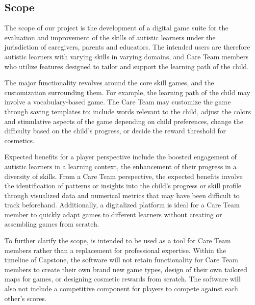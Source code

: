 \documentclass[12pt]{article}
\begin{document}
\subsection{Scope} \label{sec_Scope}

The scope of our project is the development of a digital game suite for the evaluation and improvement of the skills of autistic learners under the jurisdiction of caregivers, parents and educators. The intended users are therefore autistic learners with varying skills in varying domains, and Care Team members who utilize features designed to tailor and support the learning path of the child.

The major functionality revolves around the core skill games, and the customization surrounding them. For example, the learning path of the child may involve a vocabulary-based game. The Care Team may customize the game through saving templates to: include words relevant to the child, adjust the colors and stimulative aspects of the game depending on child preferences, change the difficulty based on the child's progress, or decide the reward threshold for cosmetics. 

Expected benefits for a player perspective include the boosted engagement of autistic learners in a learning context, the enhancement of their progress in a diversity of skills. From a Care Team perspective, the expected benefits involve the identification of patterns or insights into the child's progress or skill profile through visualized data and numerical metrics that may have been difficult to track beforehand. Additionally, a digitalized platform is ideal for a Care Team member to quickly adapt games to different learners without creating or assembling games from scratch.

To further clarify the scope, \progname{} is intended to be used as a tool for Care Team members rather than a replacement for professional expertise. Within the timeline of Capstone, the software will not retain functionality for Care Team members to create their own brand new game types, design of their own tailored maps for games, or designing cosmetic rewards from scratch. The software will also not include a competitive component for players to compete against each other's scores.
\end{document}
